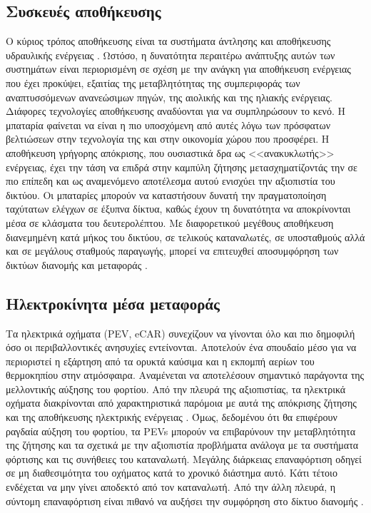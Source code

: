 \documentclass[12pt, a4paper, oneside]{report}
\begin{document}
\subsection{Συσκευές αποθήκευσης}

Ο κύριος τρόπος αποθήκευσης είναι τα συστήματα άντλησης και αποθήκευσης υδραυλικής ενέργειας \cite{39}. Ωστόσο, η δυνατότητα περαιτέρω ανάπτυξης αυτών των συστημάτων είναι περιορισμένη σε σχέση με την ανάγκη για αποθήκευση ενέργειας που έχει προκύψει, εξαιτίας της μεταβλητότητας της συμπεριφοράς των αναπτυσσόμενων ανανεώσιμων πηγών, της αιολικής και της ηλιακής ενέργειας. Διάφορες τεχνολογίες αποθήκευσης αναδύονται για να συμπληρώσουν το κενό. Η μπαταρία φαίνεται να είναι η πιο υποσχόμενη από αυτές λόγω των πρόσφατων βελτιώσεων στην τεχνολογία της και στην οικονομία χώρου που προσφέρει. Η αποθήκευση γρήγορης απόκρισης, που ουσιαστικά δρα ως <<ανακυκλωτής>> ενέργειας, έχει την τάση να επιδρά στην καμπύλη ζήτησης μετασχηματίζοντάς την σε πιο επίπεδη και ως αναμενόμενο αποτέλεσμα αυτού ενισχύει την αξιοπιστία του δικτύου. Οι μπαταρίες μπορούν να καταστήσουν δυνατή την πραγματοποίηση ταχύτατων ελέγχων σε έξυπνα δίκτυα, καθώς έχουν τη δυνατότητα να αποκρίνονται μέσα σε κλάσματα του δευτερολέπτου. Με διαφορετικού μεγέθους αποθήκευση διανεμημένη κατά μήκος του δικτύου, σε τελικούς καταναλωτές, σε υποσταθμούς αλλά και σε μεγάλους σταθμούς παραγωγής, μπορεί να επιτευχθεί αποσυμφόρηση των δικτύων διανομής και μεταφοράς \cite{39}.

\subsection{Ηλεκτροκίνητα μέσα μεταφοράς}

Τα ηλεκτρικά οχήματα (PEV, eCAR) συνεχίζουν να γίνονται όλο και πιο δημοφιλή όσο οι περιβαλλοντικές ανησυχίες εντείνονται. Αποτελούν ένα σπουδαίο μέσο για να περιοριστεί η εξάρτηση από τα ορυκτά καύσιμα και η εκπομπή αερίων του θερμοκηπίου στην ατμόσφαιρα. Αναμένεται να αποτελέσουν σημαντικό παράγοντα της μελλοντικής αύξησης του φορτίου. Από την πλευρά της αξιοπιστίας, τα ηλεκτρικά οχήματα διακρίνονται από χαρακτηριστικά παρόμοια με αυτά της απόκρισης ζήτησης και της αποθήκευσης ηλεκτρικής ενέργειας \cite{39}. Όμως, δεδομένου ότι θα επιφέρουν ραγδαία αύξηση του φορτίου, τα PEVs μπορούν να επιβαρύνουν την μεταβλητότητα της ζήτησης και τα σχετικά με την αξιοπιστία προβλήματα ανάλογα με τα συστήματα φόρτισης και τις συνήθειες του καταναλωτή. Μεγάλης διάρκειας επαναφόρτιση οδηγεί σε μη διαθεσιμότητα του οχήματος κατά το χρονικό διάστημα αυτό. Κάτι τέτοιο ενδέχεται να μην γίνει αποδεκτό από τον καταναλωτή. Από την άλλη πλευρά, η σύντομη επαναφόρτιση είναι πιθανό να αυξήσει την συμφόρηση στο δίκτυο διανομής \cite{39}.
\end{document}
